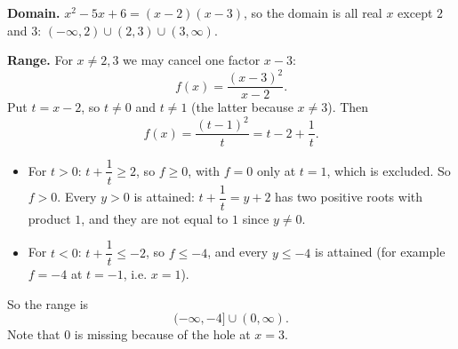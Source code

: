 \textbf{Domain.} $x^2-5x+6=(x-2)(x-3)$, so the domain is all real $x$ except $2$ and $3$: $\boxed{(-\infty,2)\cup(2,3)\cup(3,\infty)}$.

\textbf{Range.} For $x\ne2,3$ we may cancel one factor $x-3$:
\[f(x)=\dfrac{(x-3)^2}{x-2}.\]
Put $t=x-2$, so $t\ne0$ and $t\ne1$ (the latter because $x\ne3$). Then
\[f(x)=\dfrac{(t-1)^2}{t}=t-2+\dfrac1t.\]
\begin{itemize}
\item For $t>0$: $t+\dfrac1t\ge2$, so $f\ge0$, with $f=0$ only at $t=1$, which is excluded. So $f>0$. Every $y>0$ is attained: $t+\dfrac1t=y+2$ has two positive roots with product $1$, and they are not equal to $1$ since $y\ne0$.
\item For $t<0$: $t+\dfrac1t\le-2$, so $f\le-4$, and every $y\le-4$ is attained (for example $f=-4$ at $t=-1$, i.e. $x=1$).
\end{itemize}
So the range is
\[\boxed{(-\infty,-4]\cup(0,\infty)}.\]
Note that $0$ is missing because of the hole at $x=3$.
